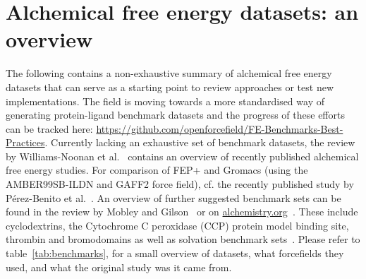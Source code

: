 \documentclass[9pt,bestpractices]{livecoms}
\begin{document}
\section{Alchemical free energy datasets: an overview}
\label{sec:benchmark}
The following contains a non-exhaustive summary of alchemical free energy datasets that can serve as a starting point to review approaches or test new implementations. The field is moving towards a more standardised way of generating protein-ligand benchmark datasets and the progress of these efforts can be tracked here: \url{https://github.com/openforcefield/FE-Benchmarks-Best-Practices}. Currently lacking an exhaustive set of benchmark datasets, the review by Williams-Noonan et al.~\cite{williams-noonan2018free} contains an overview of recently published alchemical free energy studies. For comparison of FEP+ and Gromacs (using the AMBER99SB-ILDN and GAFF2 force field), cf. the recently published study by Pérez-Benito et al.~\cite{perez-benito2019predicting}.
An overview of further suggested benchmark sets can be found in the review by Mobley and Gilson~\cite{mobley2017predicting} or on \url{alchemistry.org}~\cite{alchemistry}. These include cyclodextrins, the Cytochrome C peroxidase (CCP) protein model binding site, thrombin and bromodomains as well as solvation benchmark sets~\cite{paliwal2011benchmark}. Please refer to table~\ref{tab:benchmarks}, for a small overview of datasets, what forcefields they used, and what the original study was it came from. 
\end{document}
